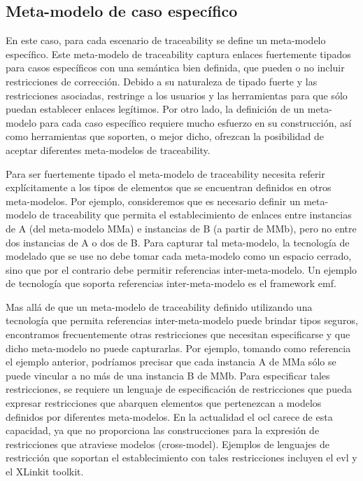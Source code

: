 \documentclass[a4paper,12pt,oneside,spanish]{book}
\begin{document}
\subsection{Meta-modelo de caso específico}

En este caso, para cada escenario de traceability se define un meta-modelo específico. Este meta-modelo de traceability captura enlaces fuertemente tipados para casos específicos con una semántica bien definida, que pueden o no incluir restricciones de corrección. Debido a su naturaleza de tipado fuerte y las restricciones asociadas, restringe a los usuarios y las herramientas para que sólo puedan establecer enlaces legítimos. Por otro lado, la definición de un meta-modelo para cada caso específico requiere mucho esfuerzo en su construcción, así como herramientas que soporten, o mejor dicho, ofrezcan la posibilidad de aceptar diferentes meta-modelos de traceability.

Para ser fuertemente tipado el meta-modelo de traceability necesita referir explícitamente a los tipos de elementos que se encuentran definidos en otros meta-modelos. Por ejemplo, consideremos que es necesario definir un meta-modelo de traceability que permita el establecimiento de enlaces entre instancias de A (del meta-modelo MMa) e instancias de B (a partir de MMb), pero no entre dos instancias de A o dos de B. Para capturar tal meta-modelo, la tecnología de modelado que se use no debe tomar cada meta-modelo como un espacio cerrado, sino que por el contrario debe permitir referencias inter-meta-modelo. Un ejemplo de tecnología que soporta referencias inter-meta-modelo es el framework \gls{emf}.

Mas allá de que un meta-modelo de traceability definido utilizando una tecnología que permita referencias inter-meta-modelo puede brindar tipos seguros, encontramos frecuentemente otras restricciones que necesitan especificarse y que dicho meta-modelo no puede capturarlas. Por ejemplo, tomando como referencia el ejemplo anterior, podríamos precisar que cada instancia A de MMa sólo se puede vincular a no más de una instancia B de MMb. Para especificar tales restricciones, se requiere un lenguaje de especificación de restricciones que pueda expresar restricciones que abarquen elementos que pertenezcan a modelos definidos por diferentes meta-modelos. En la actualidad el \gls{ocl} carece de esta capacidad, ya que no proporciona las construcciones para la expresión de restricciones que atraviese modelos (cross-model). Ejemplos de lenguajes de restricción que soportan el establecimiento con tales restricciones incluyen el \gls{evl} y el XLinkit toolkit.
\end{document}
